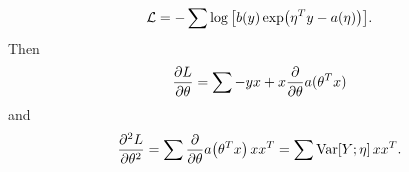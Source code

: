 \begin{answer}
	\[
		\mathcal{L}=-\sum\log\qty[b(y)\exp(\eta^Ty-a(\eta))]
	.\] 
	Then
	\[
		\pdv{L}{\theta}
		=
		\sum -yx+x\pdv{\theta}a(\theta^Tx)
	\] 
	and
	\[
		\pdv[2]{L}{\theta}
		=
		\sum \pdv{\theta}a\qty(\theta^Tx)\, xx^T
		=\sum\mathrm{Var}[Y;\eta]\, xx^T
	.\] 
\end{answer}
